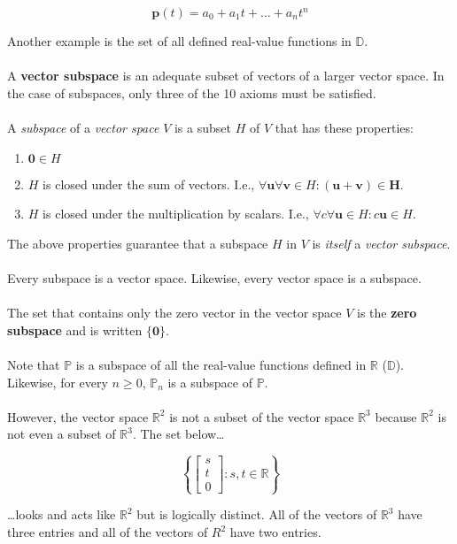 \documentclass[12pt]{article}
\newcommand{\R}{\mathbb{R}}
\newcommand{\bt}[1]{\textbf{{#1}}}
\newcommand{\bm}[1]{\mathbf{{#1}}}
\newcommand{\mb}{\begin{bmatrix}}
\newcommand{\me}{\end{bmatrix}}
\newcommand{\PP}{\mathbb{P}}
\newcommand{\mmb}[1]{\mathbb{{#1}}}
\begin{document}
$$\bm{p}(t) = a_0 + a_1t + \dots + a_n t^n$$

Another example is the set of all defined real-value functions in $\mathbb{D}$. \\ \\

A \bt{vector subspace} is an adequate subset of vectors of a larger vector space. In the case of subspaces, only three of the 10 axioms
must be satisfied. \\ \\

A \emph{subspace} of a \emph{vector space} $V$ is a subset $H$ of $V$ that has these properties:

\begin{enumerate}
    \item $\bm{0} \in H$
    \item $H$ is closed under the sum of vectors. I.e., $\forall \bm{u}\forall \bm{v} \in H: \bm{(u + v) \in H}$.
    \item $H$ is closed under the multiplication by scalars. I.e., $\forall c \forall \bm{u} \in H: c\bm{u} \in H$.
\end{enumerate}

The above properties guarantee that a subspace $H$ in $V$ is \emph{itself} a \emph{vector subspace}. \\ \\

Every subspace is a vector space. Likewise, every vector space is a subspace. \\ \\

The set that contains only the zero vector in the vector space $V$ is the \bt{zero subspace} and is written $\{\bm{0}\}$. \\ \\

Note that $\PP$ is a subspace of all the real-value functions defined in $\R$ ($\mmb{D}$). Likewise, for every $n \geq 0$, $\PP_n$ is a subspace of $\PP$. \\ \\

However, the vector space $\R^2$ is not a subset of the vector space $\R^3$ because
$\R^2$ is not even a subset of $\R^3$. The set below\dots

$$\left\{ \mb s \\ t \\ 0 \me : s, t \in \R \right\}$$

\dots looks and acts like $\R^2$ but is logically distinct. All of the vectors of $\R^3$ have three entries and all
of the vectors of $R^2$ have two entries. \\ \\
\end{document}
